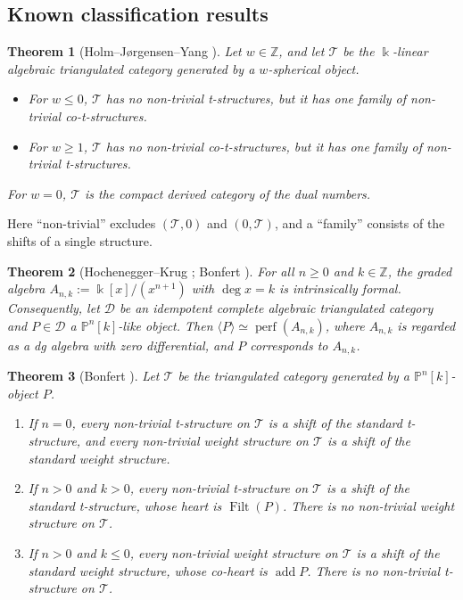 \documentclass[11pt,reqno]{amsart}
\theoremstyle{plain}
\newtheorem{theorem}{Theorem}[section]
\theoremstyle{definition}
\theoremstyle{remark}
\newcommand{\kk}{\Bbbk}
\DeclareMathOperator{\Filt}{Filt}
\DeclareMathOperator{\add}{add}
\newcommand{\thick}[1]{\langle #1\rangle}
\newcommand{\Pn}[2]{\mathbb{P}^{#1}[#2]}
\newcommand{\cD}{\mathcal{D}}
\newcommand{\cT}{\mathcal{T}}
\begin{document}
\subsection{Known classification results}

\begin{theorem}[{Holm--J\o rgensen--Yang \cite{HJY13}}]\label{thm:HJY}
Let $w\in\mathbb{Z}$, and let $\cT$ be the $\kk$-linear algebraic triangulated category generated by a $w$-spherical object.
\begin{itemize}
\item For $w\le0$, $\cT$ has no non-trivial t-structures, but it has one family of non-trivial co-t-structures.
\item For $w\ge1$, $\cT$ has no non-trivial co-t-structures, but it has one family of non-trivial t-structures.
\end{itemize}
For $w=0$, $\cT$ is the compact derived category of the dual numbers.
\end{theorem}

Here ``non-trivial'' excludes $(\cT,0)$ and $(0,\cT)$, and a ``family'' consists of the shifts of a single structure.

\begin{theorem}[{Hochenegger--Krug \cite[Lemma~2.8]{HK19}; Bonfert \cite[Props.~2.3 and~2.4]{Bonf26}}]\label{thm:formality}
For all $n\ge0$ and $k\in\mathbb{Z}$, the graded algebra $A_{n,k}:=\kk[x]/(x^{n+1})$ with $\deg x=k$ is intrinsically formal. Consequently, let $\cD$ be an idempotent complete algebraic triangulated category and $P\in\cD$ a $\Pn nk$-like object. Then $\thick P\simeq\operatorname{perf}(A_{n,k})$, where $A_{n,k}$ is regarded as a dg algebra with zero differential, and $P$ corresponds to $A_{n,k}$.
\end{theorem}

\begin{theorem}[{Bonfert \cite[Thm.~3.3]{Bonf26}}]\label{thm:Bonfert}
Let $\cT$ be the triangulated category generated by a $\Pn nk$-object $P$.
\begin{enumerate}
\item If $n=0$, every non-trivial t-structure on $\cT$ is a shift of the standard t-structure, and every non-trivial weight structure on $\cT$ is a shift of the standard weight structure.
\item If $n>0$ and $k>0$, every non-trivial t-structure on $\cT$ is a shift of the standard t-structure, whose heart is $\Filt(P)$. There is no non-trivial weight structure on $\cT$.
\item If $n>0$ and $k\le0$, every non-trivial weight structure on $\cT$ is a shift of the standard weight structure, whose co-heart is $\add P$. There is no non-trivial t-structure on $\cT$.
\end{enumerate}
\end{theorem}
\end{document}
